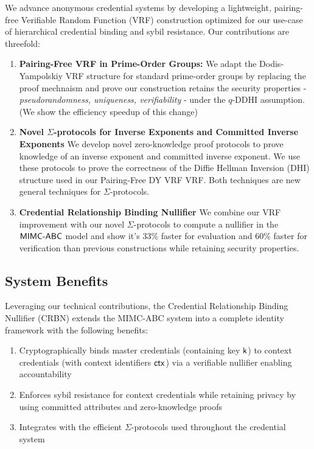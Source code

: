 We advance anonymous credential systems by developing a lightweight, pairing-free Verifiable Random Function (VRF) construction optimized for our use-case of hierarchical credential binding and sybil resistance. Our contributions are threefold:

\begin{enumerate}
        \item \textbf{Pairing-Free VRF in Prime-Order Groups:} We adapt the Dodis-Yampolskiy VRF structure for standard prime-order groups by replacing the proof mechnaism and prove our construction retains the security properties - \emph{pseudorandomness, uniqueness, verifiability} - under the $q$-DDHI assumption. (We show the efficiency speedup of this change)

        \item \textbf{Novel $\Sigma$-protocols for Inverse Exponents and Committed Inverse Exponents} We develop novel zero-knowledge proof protocols to prove knowledge of an inverse exponent and committed inverse exponent.        
        We use these protocols to prove the correctness of the Diffie Hellman Inversion (DHI) structure used in our Pairing-Free DY VRF VRF. Both techniques are new general techniques for $\Sigma$-protocols.
        
        \item \textbf{Credential Relationship Binding Nullifier } We combine our VRF improvement with our novel $\Sigma$-protocols to compute a nullifier in the $\mathsf{MIMC\text{-}ABC}$ model and show it's 33\% faster for evaluation and 60\% faster for verification than previous constructions while retaining security properties.

\end{enumerate}


\subsection{System Benefits}
Leveraging our technical contributions, the Credential Relationship Binding Nullifier (CRBN) extends the MIMC-ABC system into a complete identity framework with the following benefits:

\begin{enumerate}
    \item Cryptographically binds master credentials (containing key $\mathsf{k}$) to context credentials (with context identifiers $\mathsf{ctx}$) via a verifiable nullifier enabling accountability
    
    \item Enforces sybil resistance for context credentials while retaining privacy by using committed attributes and zero-knowledge proofs
    
    \item Integrates with the efficient $\Sigma$-protocols used throughout the credential system
\end{enumerate}

